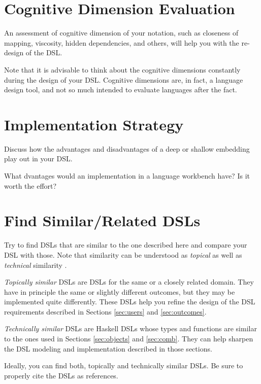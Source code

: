 \documentclass[11pt]{article}
\begin{document}
\section{Cognitive Dimension Evaluation}
\label{sec:cogdim}

An assessment of cognitive dimension of your notation, such as closeness of
mapping, viscosity, hidden dependencies, and others, will help you with the
re-design of the DSL.

Note that it is advisable to think about the cognitive dimensions constantly
during the design of your DSL. Cognitive dimensions are, in fact, a language
design tool, and not so much intended to evaluate languages after the fact.


\section{Implementation Strategy}
\label{sec:implementation}

Discuss how the advantages and disadvantages of a deep or shallow embedding
play out in your DSL.

What dvantages would an implementation in a language workbench have? Is it
worth the effort?



\section{Find Similar/Related DSLs}
\label{sec:related}

Try to find DSLs that are similar to the one described here and compare your
DSL with those. Note that similarity can be understood as \emph{topical} as
well as \emph{technical} similarity .

\emph{Topically similar} DSLs are DSLs for the same or a closely related
domain. They have in principle the same or slightly different outcomes, but
they may be implemented quite differently. These DSLs help you refine the
design of the DSL requirements described in Sections \ref{sec:users} and
\ref{sec:outcomes}.

\emph{Technically similar} DSLs are Haskell DSLs whose types and functions are
similar to the ones used in Sections \ref{sec:objects} and \ref{sec:comb}.
They can help sharpen the DSL modeling and implementation described in those
sections.

Ideally, you can find both, topically and technically similar DSLs. Be sure to
properly cite the DSLs as references.
\end{document}
